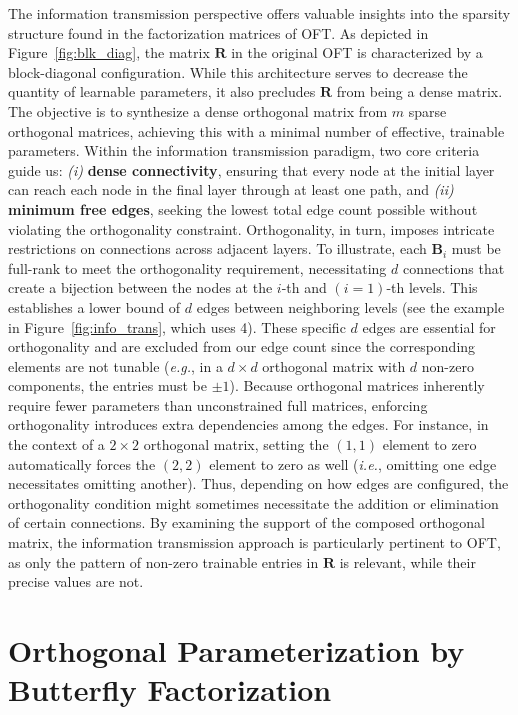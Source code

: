 The information transmission perspective offers valuable insights into the sparsity structure found in the factorization matrices of OFT. As depicted in Figure~\ref{fig:blk_diag}, the matrix $\bm{R}$ in the original OFT is characterized by a block-diagonal configuration. While this architecture serves to decrease the quantity of learnable parameters, it also precludes $\bm{R}$ from being a dense matrix. The objective is to synthesize a dense orthogonal matrix from $m$ sparse orthogonal matrices, achieving this with a minimal number of effective, trainable parameters. Within the information transmission paradigm, two core criteria guide us: \emph{(i)} \textbf{dense connectivity}, ensuring that every node at the initial layer can reach each node in the final layer through at least one path, and \emph{(ii)} \textbf{minimum free edges}, seeking the lowest total edge count possible without violating the orthogonality constraint. Orthogonality, in turn, imposes intricate restrictions on connections across adjacent layers. To illustrate, each $\bm{B}_i$ must be full-rank to meet the orthogonality requirement, necessitating $d$ connections that create a bijection between the nodes at the $i$-th and $(i=1)$-th levels. This establishes a lower bound of $d$ edges between neighboring levels (see the example in Figure~\ref{fig:info_trans}, which uses 4). These specific $d$ edges are essential for orthogonality and are excluded from our edge count since the corresponding elements are not tunable (\emph{e.g.}, in a $d\times d$ orthogonal matrix with $d$ non-zero components, the entries must be $\pm 1$). Because orthogonal matrices inherently require fewer parameters than unconstrained full matrices, enforcing orthogonality introduces extra dependencies among the edges. For instance, in the context of a $2\times 2$ orthogonal matrix, setting the $(1,1)$ element to zero automatically forces the $(2,2)$ element to zero as well (\emph{i.e.}, omitting one edge necessitates omitting another). Thus, depending on how edges are configured, the orthogonality condition might sometimes necessitate the addition or elimination of certain connections. By examining the support of the composed orthogonal matrix, the information transmission approach is particularly pertinent to OFT, as only the pattern of non-zero trainable entries in $\bm{R}$ is relevant, while their precise values are not.

\section{Orthogonal Parameterization by Butterfly Factorization}

